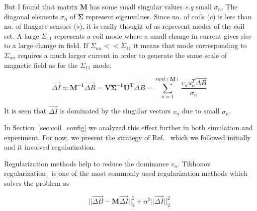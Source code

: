  

But I found that matrix $\bm{M}$ has some small singular values {\it e.g} small $\sigma_n$. The diagonal elements $\sigma_n$ of $\bm{\Sigma}$ represent eigenvalues. Since no. of coils ($c$) is less than no. of fluxgate sensors ($s$), it is easily thought of as represent modes of the coil set. A large $\Sigma_{11}$ represents a coil mode where a small change in current gives rise to a large change in field. If $\Sigma_{nn}<<\Sigma_{11}$ it means that mode corresponding to  $\Sigma_{nn}$ requires a much larger current in order to generate the same scale of magnetic field as for the $\Sigma_{11}$ mode. 

\begin{equation}\label{eq:del_I_pseudo}
    \Vec{\Delta I} \approx\bm{M^{-1}}\Vec{\Delta B}=\bm{V \Sigma^{-1} U^T}\Vec{\Delta B}=\sum_{n=1}^{rank(\bm{M})}\frac{v_n u_n^T \Vec{\Delta B}}{ \sigma_n}
\end{equation}

It is seen that $\Vec{\Delta I}$ is dominated by the singular vectors $v_n$ due to small $\sigma_n$.

In Section~\ref{sec:coil_config} we analyzed this effect further in both simulation and experiment. 
For now, we present the strategy of Ref.~\cite{bea} which we followed initially and it involved regularization.

 
Regularization methods help to reduce the dominance $v_n$. Tikhonov regularization~\cite{tikhonov2013numerical,tikhonov_book,svd,svd3} is one of the most commonly used regularization methods which solves the problem as 

\begin{equation}
    ||\Vec{\Delta B}-\bm{M}\Vec{\Delta I}||_2^2+{\alpha}^2||\Vec{\Delta I}||_2^2
\end{equation}


